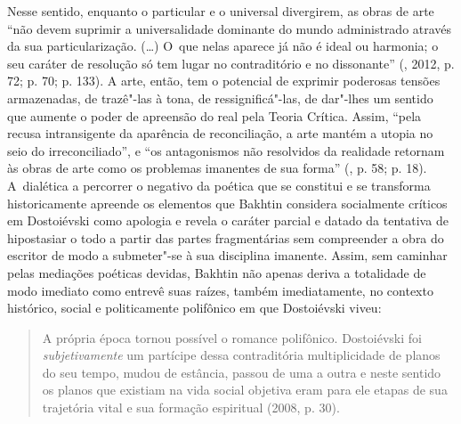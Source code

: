 Nesse sentido, enquanto o particular e o universal divergirem, as obras
de arte ``não devem suprimir a universalidade dominante do mundo
administrado através da sua particularização. (\ldots) O~que nelas aparece
já não é ideal ou harmonia; o seu caráter de resolução só tem lugar no
contraditório e no dissonante'' (, 2012, p. 72; p. 70; p. 133). A
arte, então, tem o potencial de exprimir poderosas tensões armazenadas,
de trazê"-las à tona, de ressignificá"-las, de dar"-lhes um sentido que
aumente o poder de apreensão do real pela Teoria Crítica. Assim, ``pela
recusa intransigente da aparência de reconciliação, a arte mantém a
utopia no seio do irreconciliado'', e ``os antagonismos não resolvidos
da realidade retornam às obras de arte como os problemas imanentes de
sua forma'' (, p. 58; p. 18). A~dialética a percorrer o negativo da
poética que se constitui e se transforma historicamente apreende os
elementos que Bakhtin considera socialmente críticos em Dostoiévski como
apologia e revela o caráter parcial e datado da tentativa de hipostasiar
o todo a partir das partes fragmentárias sem compreender a obra do
escritor de modo a submeter"-se à sua disciplina imanente. Assim, sem
caminhar pelas mediações poéticas devidas, Bakhtin não apenas deriva a
totalidade de modo imediato como entrevê suas raízes, também
imediatamente, no contexto histórico, social e politicamente polifônico
em que Dostoiévski viveu:

\begin{quote}
A própria época tornou possível o romance polifônico. Dostoiévski foi
\emph{subjetivamente} um partícipe dessa contraditória multiplicidade de
planos do seu tempo, mudou de estância, passou de uma a outra e neste
sentido os planos que existiam na vida social objetiva eram para ele
etapas de sua trajetória vital e sua formação espiritual (2008, p. 30).
\end{quote}

